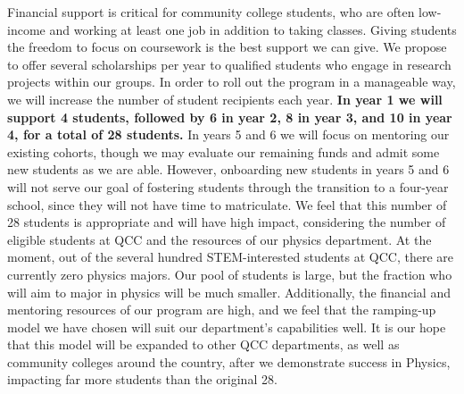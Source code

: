 \documentclass[12pt]{article}
\begin{document}



Financial support is critical for community college students, who are often low-income and working at least one job in addition to taking classes.  Giving students the freedom to focus on coursework is the best support we can give.  We propose to offer several scholarships per year to qualified students who engage in research projects within our groups.  In order to roll out the program in a manageable way, we will increase the number of student recipients each year.  {\bf In year 1 we will support 4 students, followed by 6 in year 2, 8 in year 3, and 10 in year 4, for a total of 28 students.}  In years 5 and 6 we will focus on mentoring our existing cohorts, though we may evaluate our remaining funds and admit some new students as we are able.  However, onboarding new students in years 5 and 6 
will not serve our goal of fostering students through the transition to a four-year school, since they will not have time to matriculate.  We feel that this number of 28 students is appropriate and will have high impact, considering the number of eligible students at QCC and the resources of our physics department.  At the moment, out of the several hundred STEM-interested students at QCC, there are currently zero physics majors.  Our pool of students is large, but the fraction who will aim to major in physics will be much smaller.  Additionally, the financial and mentoring resources of our program are high, and we feel that the ramping-up model we have chosen will suit our department's capabilities well.  It is our hope that this model will be expanded to other QCC departments, as well as community colleges around the country, after we demonstrate success in Physics, impacting far more students than the original 28.  
\end{document}
